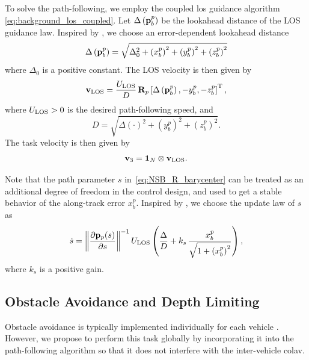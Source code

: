 To solve the path-following, we employ the coupled \gls{los} guidance algorithm \eqref{eq:background_los_coupled}.
Let $\Delta\left(\mathbf{p}_b^p\right)$ be the lookahead distance of the LOS guidance law.
Inspired by \cite{belleter_2019_observer}, we choose an error-dependent lookahead distance 
\begin{equation}
    \Delta\left(\mathbf{p}_b^p\right) = \sqrt{\Delta_0^2 + \left(x_b^p\right)^2 + \left(y_b^p\right)^2 + \left(z_b^p\right)^2}
    \label{eq:NSB_R_delta}
\end{equation}
where $\Delta_0$ is a positive constant.
The LOS velocity is then given by
\begin{equation}
    \mathbf{v}_{\rm LOS} = \frac{U_{\rm LOS}}{D} \, \mathbf{R}_p\left[\Delta\left(\mathbf{p}_b^p\right), -y_b^p, -z_b^p\right]^{\mathrm{T}},
    \label{eq:NSB_R_v_LOS}
\end{equation}
where $U_{\rm LOS} > 0$ is the desired path-following speed, and 
\begin{equation}
    D = \sqrt{\Delta(\cdot)^2 + \left(y_b^p\right)^2 + \left(z_b^p\right)^2}.
\end{equation}
The task velocity is then given by 
\begin{equation}
    \mathbf{v}_3 = \mathbf{1}_N \otimes \mathbf{v}_{\rm LOS}.
    \label{eq:NSB_R_v_3}
\end{equation}

Note that the path parameter $s$ in~\eqref{eq:NSB_R_barycenter} can be treated as an additional degree of freedom in the control design, and used to get a stable behavior of the along-track error $x_b^p$. 
Inspired by \cite{belleter_2019_observer}, we choose the update law of $s$ as
\begin{equation}
    \dot{s} = \left\|\frac{\partial \mathbf{p}_p(s)}{\partial s}\right\|^{-1} U_{\rm LOS} \left(\frac{\Delta}{D} + k_{s}\,\frac{x_b^p}{\sqrt{1+\left(x_b^p\right)^2}}\right),\label{eq:NSB_R_path_update}
\end{equation}
where $k_{s}$ is a positive gain.


\subsection{Obstacle Avoidance and Depth Limiting}
\label{sec:NSB_R_OA}

Obstacle avoidance is typically implemented individually for each vehicle \cite{antonelli_2006_kinematic}.
However, we propose to perform this task globally by incorporating it into the path-following algorithm so that it does not interfere with the inter-vehicle \gls{colav}. %

